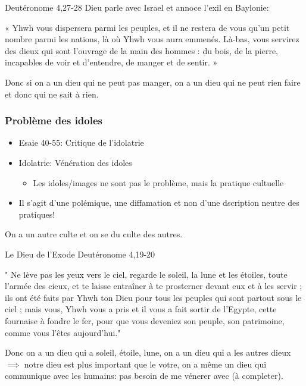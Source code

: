 \begin{parag}{Deutéronome 4,27-28}
    Dieu parle avec Israel et annoce l'exil en Baylonie:
	\begin{center}
	   « Yhwh vous dispersera parmi les peuples, et il ne restera de vous qu'un petit nombre parmi les nations, là où Yhwh vous aura emmenés. Là-bas, vous servirez des dieux qui sont l'ouvrage de la main des hommes : du bois, de la pierre, incapables de voir et d'entendre, de manger et de sentir. » 
	\end{center}
	Donc si on a un dieu qui ne peut pas manger, on a un dieu qui ne peut rien faire et donc qui ne sait à rien.
\end{parag}

\subsubsection{Problème des idoles}
\begin{itemize}
	\item Esaie 40-55: Critique de l'idolatrie
	\item Idolatrie: Vénération des idoles
		\begin{itemize}
			\item Les idoles/images ne sont pas le problème, mais la pratique cultuelle
		\end{itemize}
	\item Il s'agit d'une polémique, une diffamation et non d'une dscription neutre des pratiques!
\end{itemize}
On a un autre culte et on se  du culte des autres.


\begin{parag}{Le Dieu de l'Exode}
    Deutéronome 4,19-20
	\begin{center}
" Ne lève pas les yeux vers le ciel, regarde le soleil, la lune et les étoiles, toute l'armée des cieux, et te laisse entraîner à te prosterner devant eux et à les servir ; ils ont été faits par Yhwh ton Dieu pour tous les peuples qui sont partout sous le ciel ; mais vous, Yhwh vous a pris et il vous a fait sortir de l'Egypte, cette fournaise à fondre le fer, pour que vous deveniez son peuple, son patrimoine, comme vous l'êtes aujourd'hui."
	\end{center}
	Donc on a un dieu qui a  soleil, étoile, lune, on a un dieu qui a  les autres dieux $\implies$ notre dieu est plus important que le votre, on a même un dieu qui communique avec les humains: pas besoin de me vénerer avec (à completer).
\end{parag}


